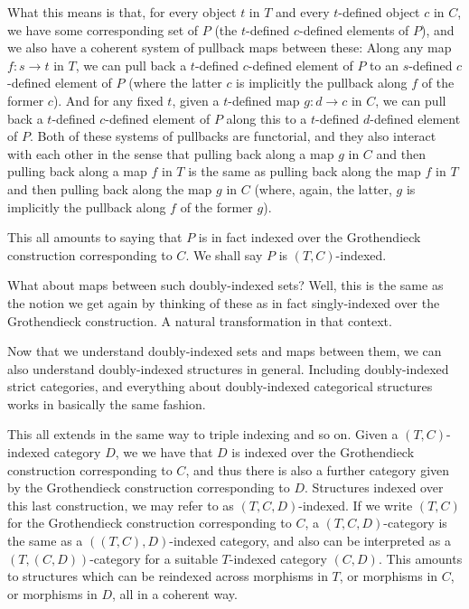 What this means is that, for every object $t$ in $T$ and every $t$-defined object $c$ in $C$, we have some corresponding set of $P$ (the $t$-defined $c$-defined elements of $P$), and we also have a coherent system of pullback maps between these: Along any map $f : s \to t$ in $T$, we can pull back a $t$-defined $c$-defined element of $P$ to an $s$-defined $c$-defined element of $P$ (where the latter $c$ is implicitly the pullback along $f$ of the former $c$). And for any fixed $t$, given a $t$-defined map $g : d \to c$ in $C$, we can pull back a $t$-defined $c$-defined element of $P$ along this to a $t$-defined $d$-defined element of $P$. Both of these systems of pullbacks are functorial, and they also interact with each other  in the sense that pulling back along a map $g$ in $C$ and then pulling back along a map $f$ in $T$ is the same as pulling back along the map $f$ in $T$ and then pulling back along the map $g$ in $C$ (where, again, the latter, $g$ is implicitly the pullback along $f$ of the former $g$).

This all amounts to saying that $P$ is in fact indexed over the Grothendieck construction corresponding to $C$. We shall say $P$ is $(T, C)$-indexed.

What about maps between such doubly-indexed sets? Well, this is the same as the notion we get again by thinking of these as in fact singly-indexed over the Grothendieck construction. A natural transformation in that context.

Now that we understand doubly-indexed sets and maps between them, we can also understand doubly-indexed structures in general. Including doubly-indexed strict categories, and everything about doubly-indexed categorical structures works in basically the same fashion.

This all extends in the same way to triple indexing and so on. Given a $(T, C)$-indexed category $D$, we we have that $D$ is indexed over the Grothendieck construction corresponding to $C$, and thus there is also a further category given by the Grothendieck construction corresponding to $D$. Structures indexed over this last construction, we may refer to as $(T, C, D)$-indexed. If we write $(T, C)$ for the Grothendieck construction corresponding to $C$, a $(T, C, D)$-category is the same as a $((T, C), D)$-indexed category, and also can be interpreted as a $(T, (C, D))$-category for a suitable $T$-indexed category $(C, D)$. This amounts to structures which can be reindexed across morphisms in $T$, or  morphisms in $C$, or morphisms in $D$, all in a coherent way.

